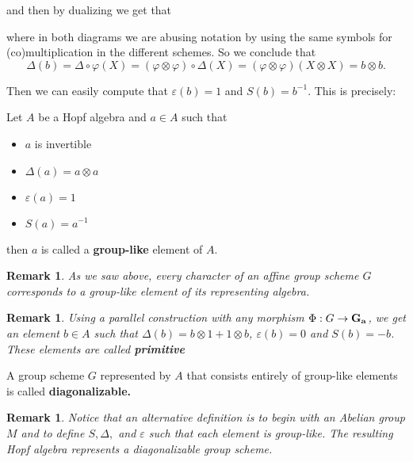 \documentclass[12pt]{article}
\theoremstyle{nonumberbreak}
\theoremstyle{changebreak}
\theoremstyle{nonumberplain}
\theoremstyle{change}
\newtheorem{rmk}[thm]{Remark}
\newcommand*{\Ga}{\ensuremath\mathbf{G_a}}
\begin{document}
\noindent and then by dualizing we get that
\newpage
\begin{figure}[h]
\end{figure}

\noindent where in both diagrams we are abusing notation by using the same symbols for 
(co)multiplication in the different schemes. So we conclude that 
\[\Delta(b)=\Delta\circ\varphi(X)=(\varphi\otimes\varphi)\circ \Delta(X)=(\varphi\otimes\varphi)(X\otimes X)=b\otimes b.\]

Then we can easily compute that $\varepsilon(b)=1$ and $S(b)=b^{-1}$. This is precisely:
\begin{defn}
	Let $A$ be a Hopf algebra and $a\in A$ such that
	\begin{itemize}
		\item $a$ is invertible
		\item $\Delta(a)=a\otimes a$
		\item $\varepsilon(a)=1$
		\item $S(a)=a^{-1}$
	\end{itemize}
	then $a$ is called a \textbf{group-like} element of $A$.
\end{defn}
\begin{rmk}
	As we saw above, every character of an affine group scheme $G$ corresponds to a 
	group-like element of its representing algebra.
\end{rmk}
\begin{rmk}
	Using a parallel construction with any morphism $\Phi:G\to\Ga$, we get an element $b\in A$
	such that $\Delta(b)=b\otimes 1+1\otimes b$, $\varepsilon(b)=0$ and $S(b)=-b$. These elements
	are called \textbf{primitive}
\end{rmk}

\begin{defn}
	A group scheme $G$ represented by $A$ that consists entirely of group-like elements is
	called \textbf{diagonalizable.}
\end{defn}
\begin{rmk}\label{rmk-diag}
	Notice that an alternative definition is to begin with an Abelian group $M$ and to 
	define $S,\Delta,$ and $\varepsilon$ such that each element is group-like. The resulting
	Hopf algebra represents a diagonalizable group scheme.
\end{rmk}
\end{document}
